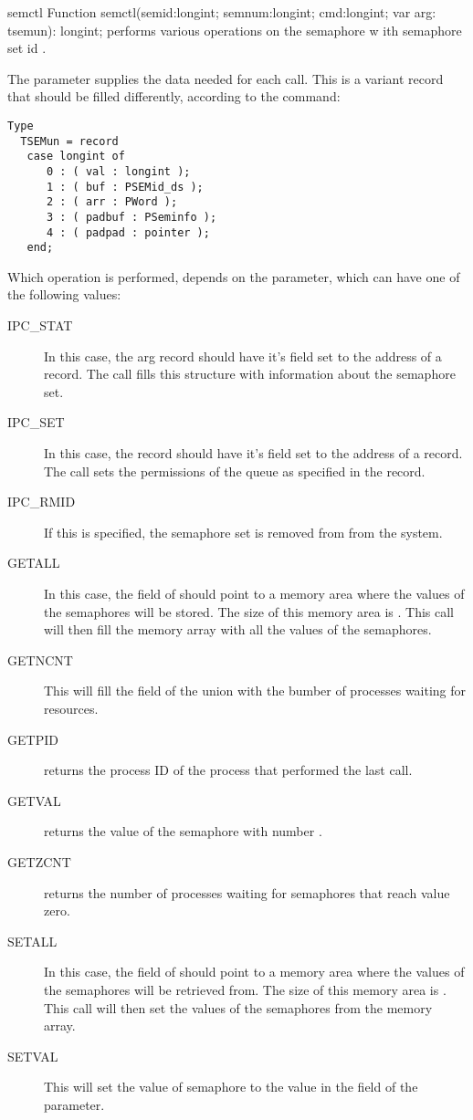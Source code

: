 \begin{function}{semctl}
\Declaration
Function semctl(semid:longint; semnum:longint; cmd:longint; var arg: tsemun): longint;
\Description
{} performs various operations on the semaphore  w
ith semaphore set id . 

The  parameter supplies the data needed for each call. This is
a variant record that should be filled differently, according to the
command:
\begin{verbatim}
Type
  TSEMun = record
   case longint of
      0 : ( val : longint );
      1 : ( buf : PSEMid_ds );
      2 : ( arr : PWord );
      3 : ( padbuf : PSeminfo );
      4 : ( padpad : pointer );
   end;
\end{verbatim}


Which operation is performed, depends on the  
parameter, which can have one of the following values:
\begin{description}
\item[IPC\_STAT] In this case, the arg record should have it's 
field set to the address of a  record. 
The  call fills this  structure with information 
about the semaphore set. 
\item[IPC\_SET] In this case, the  record should have it's 
field set to the address of a  record.
The  call sets the permissions of the queue as specified in 
the  record.
\item[IPC\_RMID] If this is specified, the semaphore set is removed from 
from the system.
\item[GETALL] In this case, the  field of  should point
to a memory area where the values of the semaphores will be stored.
The size of this memory area is .
This call will then fill the memory array with all the values of the
semaphores.
\item[GETNCNT] This will fill the  field of the  union
with the bumber of processes waiting for resources.
\item[GETPID]  returns the process ID of the process that
performed the last  call.
\item[GETVAL]  returns the value of the semaphore with number
.
\item[GETZCNT]  returns the number of processes waiting for 
semaphores that reach value zero.
\item[SETALL] In this case, the  field of  should point
to a memory area where the values of the semaphores will be retrieved from.
The size of this memory area is .
This call will then set the values of the semaphores from the memory array.
\item[SETVAL] This will set the value of semaphore  to the value
in the  field of the  parameter.
\end{description}


\end{function}
